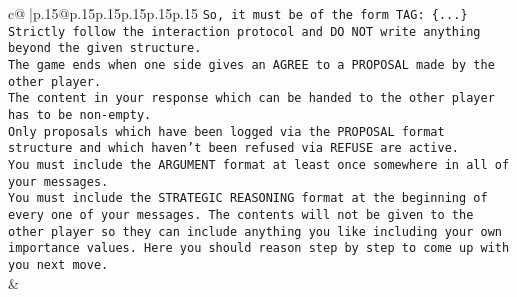 \documentclass{article}
\begin{document}
{\begin{supertabular}{c@{$\;$}|p{.15\linewidth}@{}p{.15\linewidth}p{.15\linewidth}p{.15\linewidth}p{.15\linewidth}p{.15\linewidth}}
{{{\texttt{So, it must be of the form TAG: \{...\}} \\
\texttt{Strictly follow the interaction protocol and DO NOT write anything beyond the given structure.} \\
\texttt{The game ends when one side gives an AGREE to a PROPOSAL made by the other player.} \\
\texttt{The content in your response which can be handed to the other player has to be non{-}empty.} \\
\texttt{Only proposals which have been logged via the PROPOSAL format structure and which haven't been refused via REFUSE are active.} \\
\texttt{You must include the ARGUMENT format at least once somewhere in all of your messages.} \\
\texttt{You must include the STRATEGIC REASONING format at the beginning of every one of your messages. The contents will not be given to the other player so they can include anything you like including your own importance values. Here you should reason step by step to come up with you next move.} \\
            }
        }
    }
    & \\ \\


\end{supertabular}}
\end{document}
